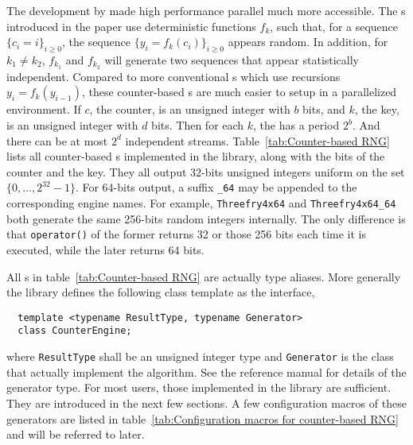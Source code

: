 The development by \textcite{Salmon:2011um} made high performance parallel \rng
much more accessible. The \rng{}s introduced in the paper use deterministic
functions $f_k$, such that, for a sequence $\{c_i = i\}_{i\ge0}$, the sequence
$\{y_i = f_k(c_i)\}_{i\ge0}$ appears random. In addition, for $k_1 \ne k_2$,
$f_{k_1}$ and $f_{k_2}$ will generate two sequences that appear statistically
independent. Compared to more conventional \rng{}s which use recursions $y_i =
f_k(y_{i - 1})$, these counter-based \rng{}s are much easier to setup in a
parallelized environment. If $c$, the counter, is an unsigned integer with $b$
bits, and $k$, the key, is an unsigned integer with $d$ bits. Then for each
$k$, the \rng has a period $2^b$. And there can be at most $2^d$ independent
streams. Table~\ref{tab:Counter-based RNG} lists all counter-based \rng{}s
implemented in the library, along with the bits of the counter and the key.
They all output 32-bits unsigned integers uniform on the set
$\{0,\dots,2^{32}-1\}$. For 64-bits output, a suffix \verb|_64| may be appended
to the corresponding \rng engine names. For example, \verb|Threefry4x64| and
\verb|Threefry4x64_64| both generate the same 256-bits random integers
internally. The only difference is that \verb|operator()| of the former
returns 32 or those 256 bits each time it is executed, while the later returns
64 bits.

All \rng{}s in table~\ref{tab:Counter-based RNG} are actually type aliases.
More generally the library defines the following class template as the
interface,
\begin{Verbatim}
  template <typename ResultType, typename Generator>
  class CounterEngine;
\end{Verbatim}
where \verb|ResultType| shall be an unsigned integer type and \verb|Generator|
is the class that actually implement the algorithm. See the reference manual
for details of the generator type. For most users, those implemented in the
library are sufficient. They are introduced in the next few sections. A few
configuration macros of these generators are listed in
table~\ref{tab:Configuration macros for counter-based RNG} and will be referred
to later.

